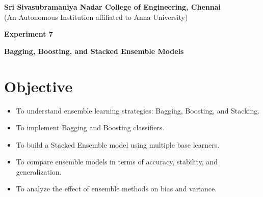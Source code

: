 \documentclass[11pt]{article}
\begin{document}
\begin{center}
    \Large \textbf{Sri Sivasubramaniya Nadar College of Engineering, Chennai} \\
    \large (An Autonomous Institution affiliated to Anna University) \\
    \vspace{0.3cm}
\end{center}

\begin{table}[h!]
\renewcommand{\arraystretch}{1.5}
\centering
{}
\end{table}

\begin{center}
    \textbf{\Large Experiment 7}
\end{center}

\begin{center}
    \textbf{Bagging, Boosting, and Stacked Ensemble Models}
\end{center}


\section*{Objective}
\begin{itemize}
    \item To understand ensemble learning strategies: Bagging, Boosting, and Stacking.
    \item To implement Bagging and Boosting classifiers.
    \item To build a Stacked Ensemble model using multiple base learners.
    \item To compare ensemble models in terms of accuracy, stability, and generalization.
    \item To analyze the effect of ensemble methods on bias and variance.
\end{itemize}
\end{document}

